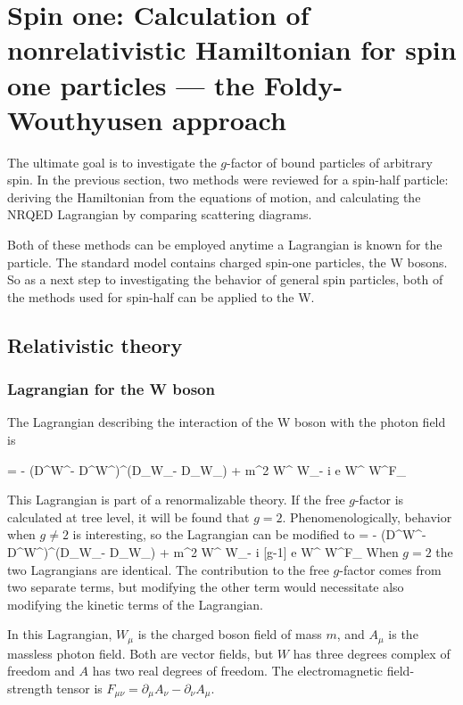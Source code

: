 \chapter{Spin one: Calculation of nonrelativistic Hamiltonian for spin one particles --- the Foldy-Wouthyusen approach}


The ultimate goal is to investigate the $g$-factor of bound particles of arbitrary spin.  In the previous section, two methods were reviewed for a spin-half particle: deriving the Hamiltonian from the equations of motion, and calculating the NRQED Lagrangian by comparing scattering diagrams.  

Both of these methods can be employed anytime a Lagrangian is known for the particle.  The standard model contains charged spin-one particles, the W bosons.  So as a next step to investigating the behavior of general spin particles, both of the methods used for spin-half can be applied to the W.

\section{Relativistic theory}

\subsection{Lagrangian for the W boson}
The Lagrangian describing the interaction of the W boson with the photon field is

\beq
{} 
	=	- (D^\mu W^\nu - D^\nu W^\mu)^\dagger (D_\mu W_\nu - D_\nu W_\mu)
		+ m^2 W^{\mu \dagger} W_\mu - i e  W^{\mu \dagger} W^\nu F_{\mu\nu}
\eeq

This Lagrangian is part of a renormalizable theory.  If the free $g$-factor is calculated at tree level, it will be found that $g=2$.  Phenomenologically, behavior when $g \neq 2$ is interesting, so the Lagrangian can be modified to
\beq \label{eq:S1:LagrangianAnom}
	=	- (D^\mu W^\nu - D^\nu W^\mu)^\dagger (D_\mu W_\nu - D_\nu W_\mu)
		+ m^2 W^{\mu \dagger} W_\mu - i [g-1] e  W^{\mu \dagger} W^\nu F_{\mu\nu}
\eeq
When $g=2$ the two Lagrangians are identical.  The contribution to the free $g$-factor comes from two separate terms, but modifying the other term would necessitate also modifying the kinetic terms of the Lagrangian.  %

In this Lagrangian, $W_\mu$ is the charged boson field of mass $m$, and $A_\mu$ is the massless photon field.  Both are vector fields, but $W$ has three degrees complex of freedom and $A$ has two real degrees of freedom.    The electromagnetic field-strength tensor is $F_{\mu\nu} = \partial_\mu A_\nu - \partial_\nu A_\mu$.  

